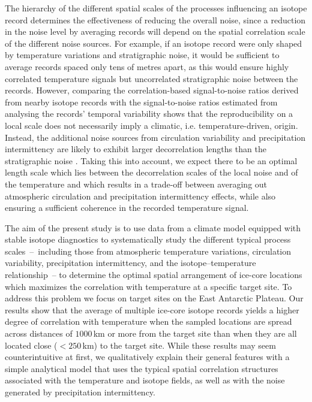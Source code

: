 \documentclass[cp]{copernicus}
\begin{document}
The hierarchy of the different spatial scales of the processes influencing an
isotope record determines the effectiveness of reducing the overall noise, since
a reduction in the noise level by averaging records will depend on the spatial
correlation scale of the different noise sources. For example, if an isotope
record were only shaped by temperature variations and stratigraphic noise, it
would be sufficient to average records spaced only tens of metres apart, as this
would ensure highly correlated temperature signals but uncorrelated
stratigraphic noise between the records. However, comparing the
correlation-based signal-to-noise ratios derived from nearby isotope records
\citep{Munch2016,Munch2017} with the signal-to-noise ratios estimated from
analysing the records' temporal variability \citep{Laepple2018} shows that the
reproducibility on a local scale does not necessarily imply a climatic, i.e.
temperature-driven, origin. Instead, the additional noise sources from
circulation variability and precipitation intermittency are likely to exhibit
larger decorrelation lengths than the stratigraphic noise
\citep{Laepple2018,Munch2018a}. Taking this into account, we expect there to be
an optimal length scale which lies between the decorrelation scales of the local
noise and of the temperature and which results in a trade-off between averaging
out atmospheric circulation and precipitation intermittency effects, while also
ensuring a sufficient coherence in the recorded temperature signal.

The aim of the present study is to use data from a climate model equipped with
stable isotope diagnostics to systematically study the different typical process
scales~--~including those from atmospheric temperature variations, circulation
variability, precipitation intermittency, and the isotope--temperature
relationship~-- to determine the optimal spatial arrangement of ice-core
locations which maximizes the correlation with temperature at a specific target
site. To address this problem we focus on target sites on the East Antarctic
Plateau. Our results show that the average of multiple ice-core isotope records
yields a higher degree of correlation with temperature when the sampled
locations are spread across distances of $1000$\,km or more from the target site
than when they are all located close ($<250$\,km) to the target site. While
these results may seem counterintuitive at first, we qualitatively explain their
general features with a simple analytical model that uses the typical spatial
correlation structures associated with the temperature and isotope fields, as
well as with the noise generated by precipitation intermittency.
\end{document}
